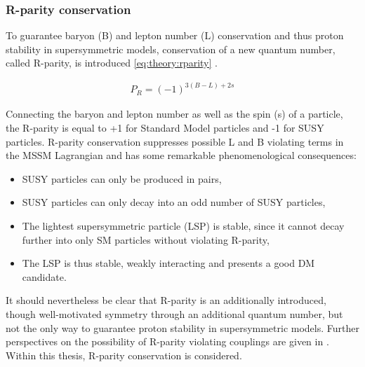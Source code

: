 \subsubsection{R-parity conservation}
To guarantee baryon (B) and lepton number (L) conservation and thus proton stability in supersymmetric models, conservation of a new quantum number, called R-parity, is introduced \eqref{eq:theory:rparity} \cite{SUSYPrimer}.

\begin{align}
P_R = (-1)^{3(B-L)+2s} \label{eq:theory:rparity}
\end{align} 

Connecting the baryon and lepton number as well as the spin (s) of a particle, the R-parity is equal to +1 for Standard Model particles and -1 for SUSY particles.
R-parity conservation suppresses possible L and B violating terms in the MSSM Lagrangian and has some remarkable phenomenological consequences:
\begin{itemize}
	\item SUSY particles can only be produced in pairs,
	\item SUSY particles can only decay into an odd number of SUSY particles,
	\item The lightest supersymmetric particle (LSP) is stable, since it cannot decay further into only SM particles without violating R-parity,
	\item The LSP is thus stable, weakly interacting and presents a good DM candidate.
\end{itemize}
It should nevertheless be clear that R-parity is an additionally introduced, though well-motivated symmetry through an additional quantum number, but not the only way to guarantee proton stability in supersymmetric models. Further perspectives on the possibility of R-parity violating couplings are given in \cite{SUSYPrimer}. Within this thesis, R-parity conservation is considered.



  
  
